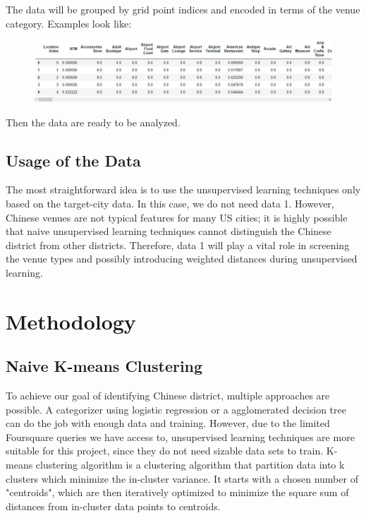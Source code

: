 \documentclass{article}
\begin{document}
\newpage

The data will be grouped by grid point indices and encoded in terms of the venue category. Examples look like:
\begin{figure}[h!]
\includegraphics[width=1.0\textwidth]{c6.jpg}
\centering
\end{figure}

Then the data are ready to be analyzed.

\subsection{Usage of the Data}

The most straightforward idea is to use the unsupervised learning techniques only based on the target-city data.
In this case, we do not need data 1.
However, Chinese venues are not typical features for many US cities; it is highly possible that naive unsupervised learning techniques cannot distinguish the Chinese district from other districts.
Therefore, data 1 will play a vital role in screening the venue types and possibly introducing weighted distances during unsupervised learning.

\newpage

\section{Methodology}
\subsection{Naive K-means Clustering}
To achieve our goal of identifying Chinese district, multiple approaches are possible.
A categorizer using logistic regression or a agglomerated decision tree can do the job with enough data and training.
However, due to the limited Foursquare queries we have access to, unsupervised learning techniques are more suitable for this project, since they do not need sizable data sets to train.
K-means clustering algorithm is a clustering algorithm that partition data into k clusters which minimize the in-cluster variance. It starts with a chosen number of "centroids", which are then iteratively optimized to minimize the square sum of distances from in-cluster data points to centroids.\cite{likas2003global}
\end{document}
